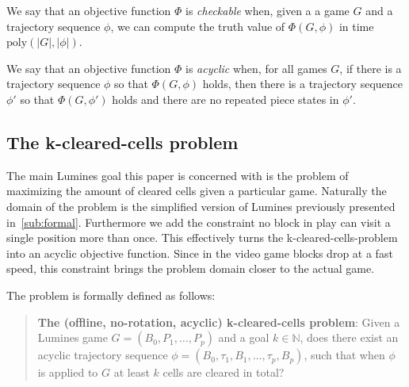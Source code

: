 \begin{defn}
\label{defn:checkable}
We say that an objective function $\Phi$ is \textit{checkable} when, given a a game $G$ and a trajectory sequence $\phi$, we can compute the truth value of $\Phi(G, \phi)$ in time $\text{poly}(|G|, |\phi|)$.
\end{defn}

\bigbreak

\begin{defn}
We say that an objective function $\Phi$ is \textit{acyclic} when, for all games $G$, if there is a trajectory sequence $\phi$ so that $\Phi(G, \phi)$ holds, then there is a trajectory sequence $\phi'$ so that $\Phi(G, \phi')$ holds and there are no repeated piece states in $\phi'$.
\end{defn}

\subsection{The k-cleared-cells problem}
The main Lumines goal this paper is concerned with is the problem of maximizing the amount of cleared cells given a particular game. Naturally the domain of the problem is the simplified version of Lumines previously presented in~\ref{sub:formal}. Furthermore we add the constraint no block in play can visit a single position more than once. This effectively turns the k-cleared-cells-problem into an acyclic objective function. Since in the video game blocks drop at a fast speed, this constraint brings the problem domain closer to the actual game.

The problem is formally defined as follows:

\begin{quote}
\textbf{The (offline, no-rotation, acyclic) k-cleared-cells problem}: Given a Lumines game $G=(B_0, P_1, \ldots, P_p)$ and a goal $k \in \mathbb{N}$, does there exist an acyclic trajectory sequence $\phi=(B_0, \tau_1, B_1, \ldots ,\tau_p, B_p)$, such that when $\phi$ is applied to $G$ at least $k$ cells are cleared in total?
\end{quote}

